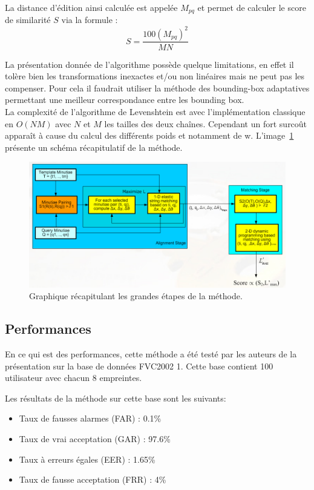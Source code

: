 \documentclass{report}
\begin{document}
La distance d'édition ainsi calculée est appelée $M_{pq}$ et permet de
calculer le score de similarité $S$ via la formule :
$$S = \frac{100 (M_{pq})^2}{MN}$$

La présentation donnée de l'algorithme possède quelque limitations, en
effet il tolère bien les transformations inexactes et/ou non linéaires
mais ne peut pas les compenser. Pour cela il faudrait utiliser la
méthode des bounding-box adaptatives permettant une meilleur
correspondance entre les bounding box.\\

La complexité de l'algorithme de Levenshtein est avec l'implémentation
classique en $O(NM)$ avec $N$ et $M$ les tailles des deux
chaînes. Cependant un fort surcoût apparaît à cause du calcul des
différents poids et notamment de w. L'image~\ref{fig:recap} présente un schéma
récapitulatif de la méthode.
\begin{figure}
  \hspace{-10em}
  \includegraphics[scale=.6]{figrecap.png}
  \caption{Graphique récapitulant les grandes étapes de la méthode.}
  \label{fig:recap}
\end{figure}

\subsection{Performances}
\label{sec:performances}

En ce qui est des performances, cette méthode a été testé par les
auteurs de la présentation sur la base de données FVC2002 1. Cette
base contient 100 utilisateur avec chacun 8 empreintes.

Les résultats de la méthode sur cette base sont les suivants:
\begin{itemize}
\item Taux de fausses alarmes (FAR) : 0.1\%
\item Taux de vrai acceptation (GAR) : 97.6\%
\item Taux à erreurs égales (EER) : 1.65\%
\item Taux de fausse acceptation (FRR) : 4\%
\end{itemize}
\end{document}
